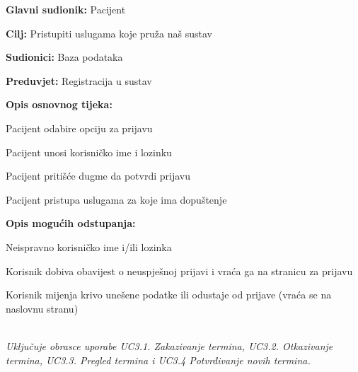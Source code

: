 					\noindent {}
					\begin{packed_item}
						
						\item \textbf{Glavni sudionik: }Pacijent
						\item  \textbf{Cilj:} Pristupiti uslugama koje pruža naš sustav
						\item  \textbf{Sudionici:} Baza podataka
						\item  \textbf{Preduvjet:} Registracija u sustav
						\item  \textbf{Opis osnovnog tijeka:}
						
						\item[] \begin{packed_enum}
							
							\item Pacijent odabire opciju za prijavu
							\item Pacijent unosi korisničko ime i lozinku
							\item Pacijent pritišće dugme da potvrdi prijavu
							\item Pacijent pristupa uslugama za koje ima dopuštenje 
						\end{packed_enum}
						
						\item  \textbf{Opis mogućih odstupanja:}
						
						\item[] \begin{packed_item}
							
							\item[2.a] Neispravno korisničko ime i/ili lozinka
							\item[] \begin{packed_enum}
								
								\item Korisnik dobiva obavijest o neuspješnoj prijavi i vraća ga na stranicu za prijavu
								\item Korisnik mijenja krivo unešene podatke ili odustaje od prijave (vraća se na naslovnu stranu)
								
							\end{packed_enum}
							
						\end{packed_item}
					\end{packed_item}
					
					\noindent {}\\
					\textit{Uključuje obrasce uporabe UC3.1. Zakazivanje termina, UC3.2. Otkazivanje termina, UC3.3. Pregled termina i UC3.4 Potvrđivanje novih termina.}\\
					
